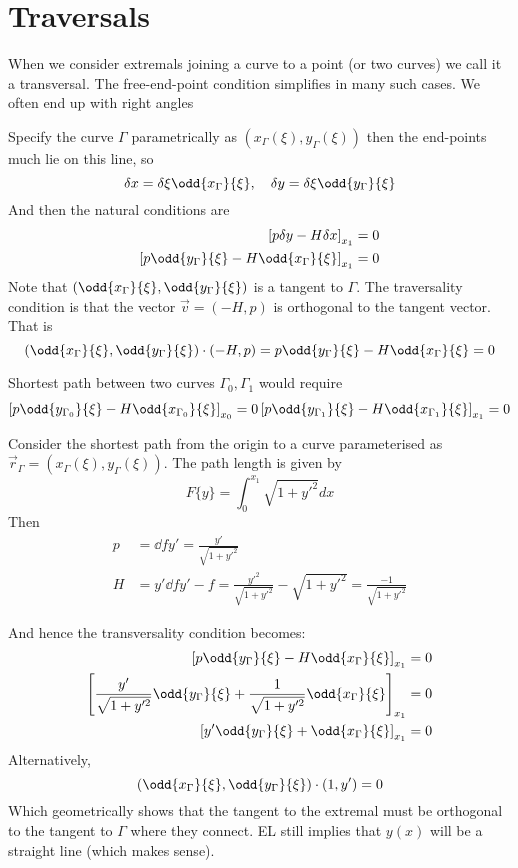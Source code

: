 \documentclass{E:/Documents/Latex/myassignment}
\begin{document}
\section{Traversals}
When we consider extremals joining a curve to a point (or two curves) we call it a transversal. The free-end-point condition simplifies in many such cases. We often end up with right angles 


Specify the curve $\Gamma$ parametrically as $(x_\Gamma(\xi), y_{\Gamma}(\xi))$ then the end-points much lie on this line, so 
\[\delta x = \delta \xi \odd {x_\Gamma}{\xi}, \quad \delta y = \delta \xi \odd{y_\Gamma}{\xi}\]
And then the natural conditions are
\begin{align*}
	\left[p \delta y - H \delta x\right]_{x_1} = 0\\
	\left[p  \odd{y_\Gamma}{\xi} - H  \odd {x_\Gamma}{\xi}\right]_{x_1} = 0\\
\end{align*}
Note that $\left(\odd {x_\Gamma}{\xi} ,\odd{y_\Gamma}{\xi}\right)$ is a tangent to $\Gamma$. 
The traversality condition is that the vector $\vec v = (-H,p)$ is orthogonal to the tangent vector. That is
\[\left(\odd {x_\Gamma}{\xi} ,\odd{y_\Gamma}{\xi}\right) \cdot (-H,p) =p  \odd{y_\Gamma}{\xi} - H  \odd {x_\Gamma}{\xi} = 0 \]


Shortest path between two curves $\Gamma_0, \Gamma_1$ would require 
\begin{align*}
	\left[p \odd {y_{\Gamma_0}}{\xi} - H \odd{x_{\Gamma_0}}{\xi}\right]_{x_0} = 0
	\left[p \odd {y_{\Gamma_1}}{\xi} - H \odd{x_{\Gamma_1}}{\xi}\right]_{x_1} = 0
\end{align*}


Consider the shortest path from the origin to a curve parameterised as $\vec r_{\Gamma} = (x_\Gamma(\xi), y_{\Gamma}(\xi))$.
The path length is given by
\[F\{y\} = \int_0^{x_1} \sqrt{1 + y'^2} dx\]
Then
\begin{align*}
	p &= \dd f{y'} = \frac{y'}{\sqrt{1+y'^2}}\\
	H &= y' \dd f{y'} - f = \frac{y'^2}{\sqrt{1+y'^2}} - \sqrt{1 + y'^2} = \frac{-1}{\sqrt{1+y'^2}}
\end{align*}


And hence the transversality condition becomes:
\begin{align*}
	\left[p \odd {y_{\Gamma}}{\xi} - H \odd{x_{\Gamma}}{\xi}\right]_{x_1} = 0\\
	\left[\frac{y'}{\sqrt{1+y'^2}} \odd {y_{\Gamma}}{\xi} + \frac{1}{\sqrt{1+y'^2}} \odd{x_{\Gamma}}{\xi}\right]_{x_1} = 0\\
	\left[y'\odd {y_{\Gamma}}{\xi} + \odd{x_{\Gamma}}{\xi}\right]_{x_1} = 0\\
\end{align*}
Alternatively,
\[\left(\odd{x_\Gamma}{\xi} , \odd{y_{\Gamma}}{\xi}\right) \cdot (1,y') = 0\]
Which geometrically shows that the tangent to the extremal must be orthogonal to the tangent to $\Gamma$ where they connect. 
EL still implies that $y(x)$ will be a straight line (which makes sense).
\end{document}
